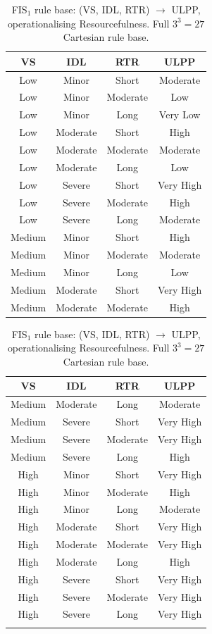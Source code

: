 \documentclass[applsci,article,submit,moreauthors,pdftex]{Definitions/mdpi}
\begin{document}
\begin{table}[!ht]
\centering\footnotesize
\setlength{\tabcolsep}{4pt}
\caption{FIS$_1$ rule base: (VS, IDL, RTR) $\to$ ULPP, operationalising
Resourcefulness. Full $3^3 = 27$ Cartesian rule base.}
\label{tab:rules-fis1}
\begin{minipage}[t]{0.48\textwidth}\centering
\begin{tabular}{cccc}
\toprule
VS & IDL & RTR & ULPP \\
\midrule
Low & Minor & Short & Moderate \\
Low & Minor & Moderate & Low \\
Low & Minor & Long & Very Low \\
Low & Moderate & Short & High \\
Low & Moderate & Moderate & Moderate \\
Low & Moderate & Long & Low \\
Low & Severe & Short & Very High \\
Low & Severe & Moderate & High \\
Low & Severe & Long & Moderate \\
Medium & Minor & Short & High \\
Medium & Minor & Moderate & Moderate \\
Medium & Minor & Long & Low \\
Medium & Moderate & Short & Very High \\
Medium & Moderate & Moderate & High \\
\bottomrule
\end{tabular}
\end{minipage}\hfill
\begin{minipage}[t]{0.48\textwidth}\centering
\begin{tabular}{cccc}
\toprule
VS & IDL & RTR & ULPP \\
\midrule
Medium & Moderate & Long & Moderate \\
Medium & Severe & Short & Very High \\
Medium & Severe & Moderate & Very High \\
Medium & Severe & Long & High \\
High & Minor & Short & Very High \\
High & Minor & Moderate & High \\
High & Minor & Long & Moderate \\
High & Moderate & Short & Very High \\
High & Moderate & Moderate & Very High \\
High & Moderate & Long & High \\
High & Severe & Short & Very High \\
High & Severe & Moderate & Very High \\
High & Severe & Long & Very High \\
& & & \\
\bottomrule
\end{tabular}
\end{minipage}
\end{table}
\end{document}
